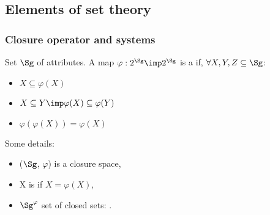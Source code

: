 

\subsection{Elements of set theory}

\begin{frame}
\frametitle{Closure operator and systems}

Set $\Sg$ of attributes. A map $\varphi: 2^{\Sg} \imp 2^{\Sg}$ is a 
 if, $\forall X, Y, Z \subseteq \Sg$:
\begin{itemize}
	\item $X \subseteq \varphi(X)$ \quad {}
	\item $X \subseteq Y \imp \varphi(X) \subseteq \varphi(Y)$ 
	\quad {}
	\item $\varphi(\varphi(X)) = \varphi(X)$ \quad {}
\end{itemize}

\vspace{1.2em}

Some details:
\begin{itemize}
	\item ($\Sg$, $\varphi$) is a closure space,
	\item X is  if $X = \varphi(X)$,
	\item $\Sg^\varphi$ set of closed sets: .
\end{itemize}

\end{frame}

